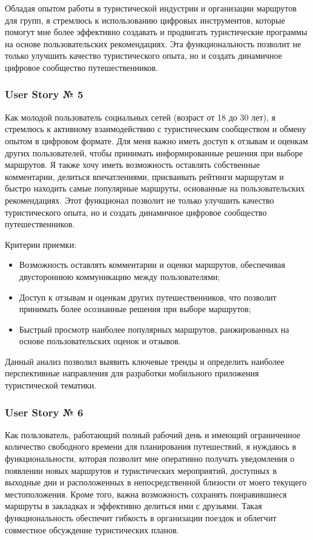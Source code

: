 \noindent Обладая опытом работы в туристической индустрии и организации маршрутов для групп, я стремлюсь к использованию цифровых инструментов, которые помогут мне более эффективно создавать и продвигать туристические программы на основе пользовательских рекомендациях. Эта функциональность позволит не только улучшить качество туристического опыта, но и создать динамичное цифровое сообщество путешественников.

\subsubsection*{User Story № 5} 
Как молодой пользователь социальных сетей (возраст от 18 до 30 лет), я стремлюсь к активному взаимодействию с туристическим сообществом и обмену опытом в цифровом формате. Для меня важно иметь доступ к отзывам и оценкам других пользователей, чтобы принимать информированные решения при выборе маршрутов. Я также хочу иметь возможность оставлять собственные комментарии, делиться впечатлениями, присваивать рейтинги маршрутам и быстро находить самые популярные маршруты, основанные на пользовательских рекомендациях. Этот функционал позволит не только улучшить качество туристического опыта, но и создать динамичное цифровое сообщество путешественников.

Критерии приемки:
\begin{itemize}
    \item Возможность оставлять комментарии и оценки маршрутов, обеспечивая двустороннюю коммуникацию между пользователями;
    \item Доступ к отзывам и оценкам других путешественников, что позволит принимать более осознанные решения при выборе маршрутов;
    \item Быстрый просмотр наиболее популярных маршрутов, ранжированных на основе пользовательских оценок и отзывов.
\end{itemize}

\noindent Данный анализ позволил выявить ключевые тренды и определить наиболее перспективные направления для разработки мобильного приложения туристической тематики.

\subsubsection*{User Story № 6} 
Как пользователь, работающий полный рабочий день и имеющий ограниченное количество свободного времени для планирования путешествий, я нуждаюсь в функциональности, которая позволит мне оперативно получать уведомления о появлении новых маршрутов и туристических мероприятий, доступных в выходные дни и расположенных в непосредственной близости от моего текущего местоположения. Кроме того, важна возможность сохранять понравившиеся маршруты в закладках и эффективно делиться ими с друзьями. Такая функциональность обеспечит гибкость в организации поездок и облегчит совместное обсуждение туристических планов.

